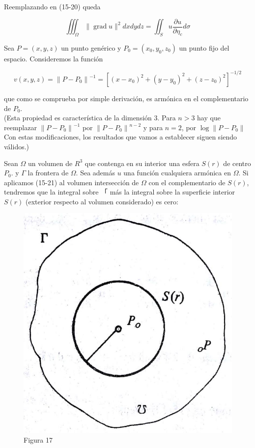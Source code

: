 \documentclass[10pt]{article}
\theoremstyle{plain}
\theoremstyle{definition}
\theoremstyle{remark}
\begin{document}
Reemplazando en (15-20) queda


\begin{equation*}
\iiint_{\Omega}\|\operatorname{grad} u\|^{2} d x d y d z=\iint_{S} u \frac{\partial u}{\partial \eta_{c}} d \sigma \tag{15-23}
\end{equation*}


Sea $P=(x, y, z)$ un punto genérico y $P_{0}=\left(x_{0}, y_{0}, z_{0}\right)$ un punto fijo del espacio. Consideremos la función

$$
v(x, y, z)=\left\|P-P_{0}\right\|^{-1}=\left[\left(x-x_{0}\right)^{2}+\left(y-y_{0}\right)^{2}+\left(z-z_{0}\right)^{2}\right]^{-1 / 2}
$$

que como se comprueba por simple derivación, es armónica en el complementario de $P_{0}$.\\
(Esta propiedad es característica de la dimensión 3. Para $n>3$ hay que reemplazar $\left\|P-P_{0}\right\|^{-1}$ por $\left\|P-P_{0}\right\|^{n-2}$ y para $n=2$, por $\log \left\|P-P_{0}\right\|$ Con estas modificaciones, los resultados que vamos a establecer siguen siendo válidos.)

Sean $\Omega$ un volumen de $R^{3}$ que contenga en su interior una esfera $S(r)$ de centro $P_{0}$. y $\Gamma$ la frontera de $\Omega$. Sea además $u$ una función cualquiera armónica en $\Omega$. Si aplicamos (15-21) al volumen intersección de $\Omega$ con el complementario de $S(r)$, tendremos que la integral sobre 「 más la integral sobre la superficie interior $S(r)$ (exterior respecto al volumen considerado) es cero:

\begin{figure}[h]
\begin{center}
  \includegraphics[width=\textwidth]{2025_09_05_adecef5eb2053bc129b5g-363}
\captionsetup{labelformat=empty}
\caption{Figura 17}
\end{center}
\end{figure}
\end{document}
